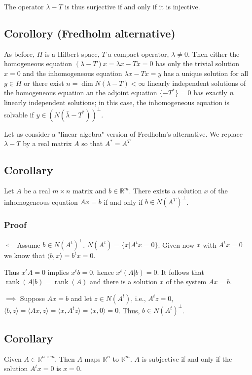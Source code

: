\documentclass[11pt]{article}
\def\R{\mathbb{R}}
\begin{document}
The operator \(\lambda - T\) is thus surjective if and only if it is injective.
\subsection{Corollory (Fredholm alternative)}
\label{sec:org3f5ca36}
As before, \(H\) is a Hilbert space, \(T\) a compact operator, \(\lambda \neq 0\).
Then either the homogeneous equation \((\lambda - T)x = \lambda x - T x = 0\)
has only the trivial solution \(x = 0\) and the inhomogeneous equation \(\lambda
   x - Tx = y\) has a unique solution for all \(y \in H\) or there exist \(n = \dim
   N(\lambda - T) < \infty\) linearly independent solutions of the homogeneous
equation an the adjoint equation \(\{-T^{*}\} = 0\) has exactly \(n\) linearly
independent solutions; in this case, the inhomogeneous equation is solvable
if \(y \in (N(\bar{\lambda} - T^{*}))^\perp\).

Let us consider a "linear algebra" version of Fredholm's alternative. We
replace \(\lambda - T\) by a real matrix \(A\) so that \(A^{*} = A^{T}\)
\subsection{Corollary}
\label{sec:orgb990ed1}
Let \(A\) be a real \(m\times n\) matrix and \(b \in \R^m\). There exists a
solution \(x\) of the inhomogeneous equation \(Ax = b\) if and only if \(b \in
   N(A^{T})^\perp\).
\subsubsection{Proof}
\label{sec:orgbc55964}
\(\Leftarrow\) Assume \(b \in N(A^{t})^\perp\). \(N(A^{t}) = \{x \vert A^{t} x =
    0\}\). Given now \(x\) with \(A^{t}x = 0\) we know that \(\langle b, x\rangle =
    b^{t}x = 0\).

Thus \(x^t A = 0\) implies \(x^t b = 0\), hence \(x^{t}(A | b) = 0\). It follows
that \(\operatorname{rank}(A|b) = \operatorname{rank}(A)\) and there is a
solution \(x\) of the system \(Ax = b\).

\(\implies\) Suppose \(Ax = b\) and let \(z \in N(A^{t})\), i.e., \(A^{t}z = 0\),
\(\langle b, z \rangle = \langle Ax, z\rangle = \langle x, A^{t} z \rangle =
    \langle x, 0 \rangle = 0\). Thus, \(b \in N(A^{t})^\perp\).
\subsection{Corollary}
\label{sec:orgddda369}
Given \(A \in \R^{n\times m}\). Then \(A\) maps \(\R^n\) to \(\R^m\). \(A\) is
subjective if and only if the solution \(A^{t}x = 0\) is \(x = 0\).
\end{document}

